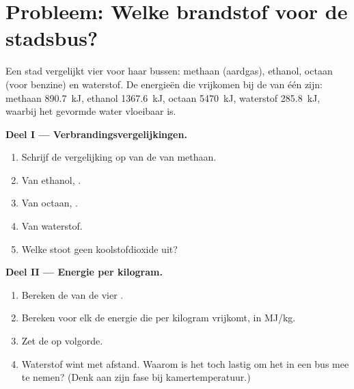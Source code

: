 \section{Probleem: Welke brandstof voor de stadsbus?}

\begin{problem}
\label{pb:g11:reaction-energy:1}
Een stad vergelijkt vier  voor haar bussen: methaan
(aardgas), ethanol, octaan (voor benzine) en waterstof. De energieën die
vrijkomen bij de  van één  zijn: methaan
\qty{890.7}{kJ}, ethanol \qty{1367.6}{kJ}, octaan \qty{5470}{kJ},
waterstof \qty{285.8}{kJ}, waarbij het gevormde water vloeibaar is.

\medskip
\noindent\textbf{Deel I --- Verbrandingsvergelijkingen.}
\begin{enumerate}
  \item Schrijf de vergelijking op van de  van
        methaan.
  \item Van ethanol, .
  \item Van octaan, .
  \item Van waterstof.
  \item Welke  stoot geen koolstofdioxide uit?
\end{enumerate}

\medskip
\noindent\textbf{Deel II --- Energie per kilogram.}
\begin{enumerate}[resume]
  \item Bereken de  van de vier .
  \item Bereken voor elk de energie die per kilogram vrijkomt, in
        \si{MJ/kg}.
  \item Zet de  op volgorde.
  \item Waterstof wint met afstand. Waarom is het toch lastig om het in
        een bus mee te nemen? (Denk aan zijn fase bij kamertemperatuur.)
\end{enumerate}


\end{problem}
